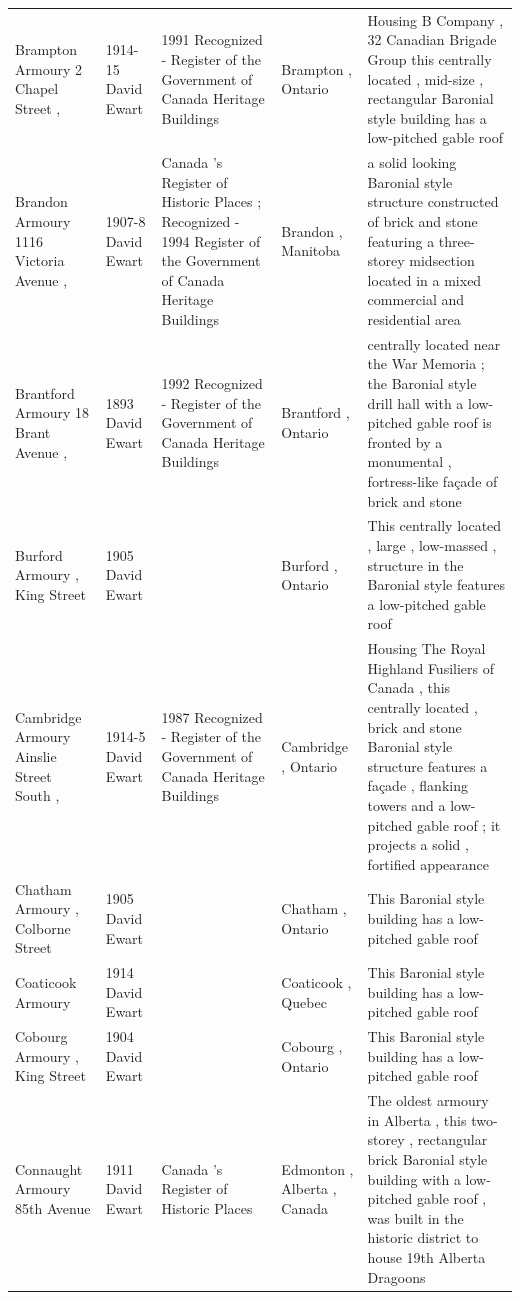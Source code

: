 \documentclass{article}
\begin{document}
\begin{tabular}{lllll}
Brampton Armoury 2 Chapel Street , & 1914-15 David Ewart & 1991 Recognized - Register of the Government of Canada Heritage Buildings & Brampton , Ontario & Housing B Company , 32 Canadian Brigade Group this centrally located , mid-size , rectangular Baronial style building has a low-pitched gable roof \\
Brandon Armoury 1116 Victoria Avenue , & 1907-8 David Ewart & Canada 's Register of Historic Places ; Recognized - 1994 Register of the Government of Canada Heritage Buildings & Brandon , Manitoba & a solid looking Baronial style structure constructed of brick and stone featuring a three-storey midsection located in a mixed commercial and residential area \\
Brantford Armoury 18 Brant Avenue , & 1893 David Ewart & 1992 Recognized - Register of the Government of Canada Heritage Buildings & Brantford , Ontario & centrally located near the War Memoria ; the Baronial style drill hall with a low-pitched gable roof is fronted by a monumental , fortress-like façade of brick and stone \\
Burford Armoury , King Street & 1905 David Ewart &  & Burford , Ontario & This centrally located , large , low-massed , structure in the Baronial style features a low-pitched gable roof \\
Cambridge Armoury Ainslie Street South , & 1914-5 David Ewart & 1987 Recognized - Register of the Government of Canada Heritage Buildings & Cambridge , Ontario & Housing The Royal Highland Fusiliers of Canada , this centrally located , brick and stone Baronial style structure features a façade , flanking towers and a low-pitched gable roof ; it projects a solid , fortified appearance \\
Chatham Armoury , Colborne Street & 1905 David Ewart &  & Chatham , Ontario & This Baronial style building has a low-pitched gable roof \\
Coaticook Armoury & 1914 David Ewart &  & Coaticook , Quebec & This Baronial style building has a low-pitched gable roof \\
Cobourg Armoury , King Street & 1904 David Ewart &  & Cobourg , Ontario & This Baronial style building has a low-pitched gable roof \\
Connaught Armoury 85th Avenue & 1911 David Ewart & Canada 's Register of Historic Places & Edmonton , Alberta , Canada & The oldest armoury in Alberta , this two-storey , rectangular brick Baronial style building with a low-pitched gable roof , was built in the historic district to house 19th Alberta Dragoons \\

\end{tabular}
\end{document}
